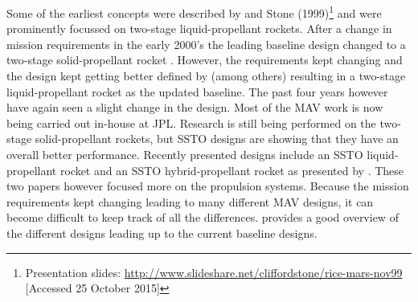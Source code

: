 Some of the earliest concepts were described by \cite{whitehead1997,guernsey1998,desai1998} and Stone (1999)\footnote{\label{stone} Presentation slides: \url{http://www.slideshare.net/cliffordstone/rice-mars-nov99} [Accessed 25 October 2015]} and were prominently focussed on two-stage liquid-propellant rockets. After a change in mission requirements in the early 2000's the leading baseline design changed to a two-stage solid-propellant rocket \citep{stephenson2002,whitehead2005,stephenson2006}. However, the requirements kept changing and the design kept getting better defined by (among others) \cite{sengupta2012,trinidad2012,mungas2012,mppg2012} resulting in a two-stage liquid-propellant rocket as the updated baseline. The past four years however have again seen a slight change in the design. Most of the \ac{MAV} work is now being carried out in-house at \ac{JPL}. Research is still being performed on the two-stage solid-propellant rockets, but \ac{SSTO} designs are showing that they have an overall better performance. Recently presented designs include an \ac{SSTO} liquid-propellant rocket \citep{vaughan2016technology} and an \ac{SSTO} hybrid-propellant rocket as presented by \cite{karp2016technology}. These two papers however focused more on the propulsion systems. Because the mission requirements kept changing leading to many different \ac{MAV} designs, it can become difficult to keep track of all the differences. \cite{shotwell2016history} provides a good overview of the different designs leading up to the current baseline designs. \\







